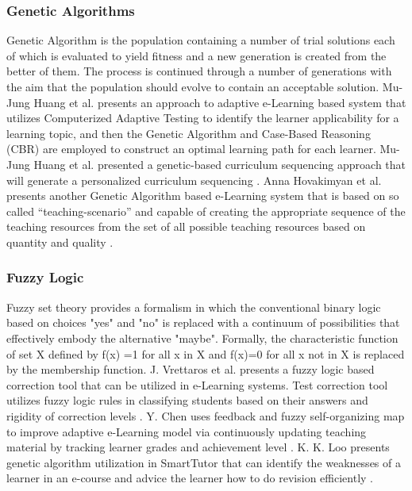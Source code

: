 \documentclass[12pt,a4paper,final,twoside,onecolumn,titlepage]{book}
\begin{document}
\subsubsection{Genetic Algorithms}
Genetic Algorithm is the population containing a number of trial solutions each of which is evaluated to yield fitness and a new generation is created from the better of them. The process is continued through a number of generations with the aim that the population should evolve to contain an acceptable solution. Mu-Jung Huang et al. presents an approach to adaptive e-Learning based system that utilizes Computerized Adaptive Testing to identify the learner applicability for a learning topic, and then the Genetic Algorithm and Case-Based Reasoning (CBR) are employed to construct an optimal learning path for each learner. Mu-Jung Huang et al. presented a genetic-based curriculum sequencing approach that will generate a personalized curriculum sequencing \cite{R32}. Anna Hovakimyan et al. presents another Genetic Algorithm based e-Learning system that is based on so called “teaching-scenario” and capable of creating the appropriate sequence of the teaching resources from the set of all possible teaching resources based on quantity and quality \cite{R33}.

\subsubsection{Fuzzy Logic}
Fuzzy set theory provides a formalism in which the conventional binary logic based on choices "yes" and "no" is replaced with a continuum of possibilities that effectively embody the alternative "maybe". Formally, the characteristic function of set X defined by f(x) =1 for all x in X and f(x)=0 for all x not in X is replaced by the membership function. J. Vrettaros et al. presents a fuzzy logic based correction tool that can be utilized in e-Learning systems. Test correction tool utilizes fuzzy logic rules in classifying students based on their answers and rigidity of correction levels \cite{R34}. Y. Chen uses feedback and fuzzy self-organizing map to improve adaptive e-Learning model via continuously updating teaching material by tracking learner grades and achievement level \cite{R35}. K. K. Loo presents genetic algorithm utilization in SmartTutor that can identify the weaknesses of a learner in an e-course and advice the learner how to do revision efficiently \cite{R36}.
\end{document}
